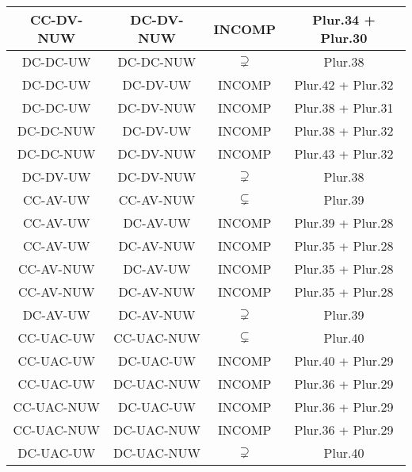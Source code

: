 \begin{longtable}{|c|c|c|c|}
\hline
CC-DV-NUW&DC-DV-NUW&INCOMP&Plur.34 + Plur.30\\
\hline
DC-DC-UW&DC-DC-NUW&$\supsetneq$&Plur.38\\
\hline
DC-DC-UW&DC-DV-UW&INCOMP&Plur.42 + Plur.32\\
\hline
DC-DC-UW&DC-DV-NUW&INCOMP&Plur.38 + Plur.31\\
\hline
DC-DC-NUW&DC-DV-UW&INCOMP&Plur.38 + Plur.32\\
\hline
DC-DC-NUW&DC-DV-NUW&INCOMP&Plur.43 + Plur.32\\
\hline
DC-DV-UW&DC-DV-NUW&$\supsetneq$&Plur.38\\
\hline
CC-AV-UW&CC-AV-NUW&$\subsetneq$&Plur.39\\
\hline
CC-AV-UW&DC-AV-UW&INCOMP&Plur.39 + Plur.28\\
\hline
CC-AV-UW&DC-AV-NUW&INCOMP&Plur.35 + Plur.28\\
\hline
CC-AV-NUW&DC-AV-UW&INCOMP&Plur.35 + Plur.28\\
\hline
CC-AV-NUW&DC-AV-NUW&INCOMP&Plur.35 + Plur.28\\
\hline
DC-AV-UW&DC-AV-NUW&$\supsetneq$&Plur.39\\
\hline
CC-UAC-UW&CC-UAC-NUW&$\subsetneq$&Plur.40\\
\hline
CC-UAC-UW&DC-UAC-UW&INCOMP&Plur.40 + Plur.29\\
\hline
CC-UAC-UW&DC-UAC-NUW&INCOMP&Plur.36 + Plur.29\\
\hline
CC-UAC-NUW&DC-UAC-UW&INCOMP&Plur.36 + Plur.29\\
\hline
CC-UAC-NUW&DC-UAC-NUW&INCOMP&Plur.36 + Plur.29\\
\hline
DC-UAC-UW&DC-UAC-NUW&$\supsetneq$&Plur.40\\
\hline
\end{longtable}
